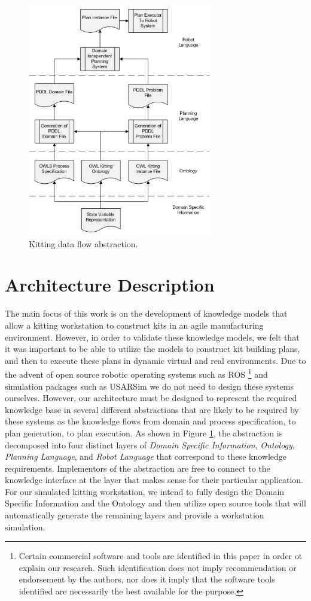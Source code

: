 \documentclass[a4paper, 10pt, conference]{ieeeconf}      %
\begin{document}
\begin{figure}[htb]
\includegraphics[width=8cm]{images/ProcessDataFlowV2.jpg}
\caption{Kitting data flow abstraction.}
\label{fig:ProcessDataFlow}
\end{figure}

\section{Architecture Description}
\label{sect:Architecture}
The main focus of this work is on the development of knowledge models that allow a kitting workstation to construct kits
in an agile manufacturing environment. However, in order to validate these knowledge models, we felt that it was
important to be able to utilize the models to construct kit building plans, and then to execute these plans in dynamic
virtual and real environments. Due to the advent of open source robotic operating systems such as ROS \cite{ROS}
 \footnote{Certain commercial software and tools are identified in this paper in order ot explain our research. Such identification does not imply
recommendation or endorsement by the authors, nor does it imply that the software tools identified are necessarily the best available for the purpose.}
 and simulation
packages such as USARSim \cite{Balakirsky2007} we do not need to design these systems ourselves. However, our architecture must
be designed to represent the required knowledge base in several different abstractions that are likely to be
required by these systems as the knowledge flows from domain and process specification, to plan generation, to plan execution.
As shown in Figure \ref{fig:ProcessDataFlow}, the abstraction is decomposed into four
distinct layers of {\it Domain Specific Information}, {\it Ontology}, {\it Planning Language}, and {\it Robot Language} that correspond to these
knowledge requirements. Implementors of the abstraction are free to connect to the knowledge interface at the layer that makes sense for
their particular application. For our simulated kitting workstation, we intend to fully design the Domain Specific Information and the Ontology and
then utilize open
source tools that will automatically generate the remaining layers and provide a workstation simulation.
\end{document}
